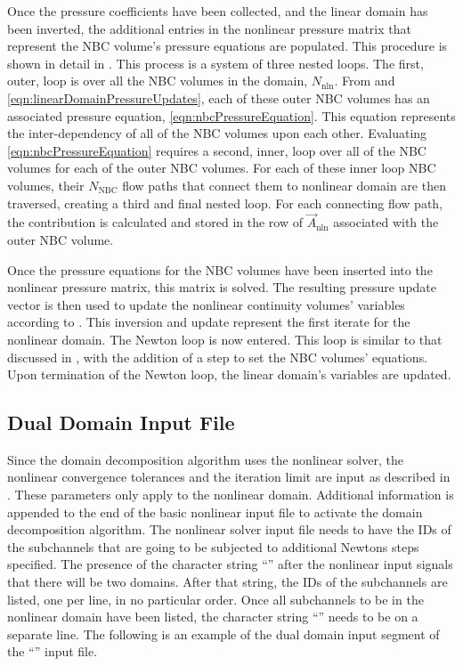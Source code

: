 Once the pressure coefficients have been collected, and the linear domain has been inverted, the additional entries in the nonlinear pressure matrix that represent the NBC volume's pressure equations are populated.
This procedure is shown in detail in .
This process is a system of three nested loops.
The first, outer, loop is over all the NBC volumes in the domain, $N_{\text{nln}}$.
From  and \eqref{eqn:linearDomainPressureUpdates}, each of these outer NBC volumes has an associated pressure equation, \eqref{eqn:nbcPressureEquation}.
This equation represents the inter-dependency of all of the NBC volumes upon each other.
Evaluating \eqref{eqn:nbcPressureEquation} requires a second, inner, loop over all of the NBC volumes for each of the outer NBC volumes.
For each of these inner loop NBC volumes, their $N_{\text{NBC}}$ flow paths that connect them to nonlinear domain are then traversed, creating a third and final nested loop.
For each connecting flow path, the contribution is calculated and stored in the row of $\vec{A}_{\text{nln}}$ associated with the outer NBC volume.

Once the pressure equations for the NBC volumes have been inserted into the nonlinear pressure matrix, this matrix is solved.
The resulting pressure update vector is then used to update the nonlinear continuity volumes' variables according to .
This inversion and update represent the first iterate for the nonlinear domain.
The Newton loop is now entered.
This loop is similar to that discussed in , with the addition of a step to set the NBC volumes' equations.
Upon termination of the Newton loop, the linear domain's variables are updated.

\subsection{Dual Domain Input File}
\label{subsect:domDecompInputFile}

Since the domain decomposition algorithm uses the nonlinear solver, the nonlinear convergence tolerances and the iteration limit are input as described in .
These parameters only apply to the nonlinear domain.
Additional information is appended to the end of the basic nonlinear input file to activate the domain decomposition algorithm.
The nonlinear solver input file needs to have the IDs of the subchannels that are going to be subjected to additional Newtons steps specified.
The presence of the character string ``'' after the nonlinear input signals that there will be two domains.
After that string, the IDs of the subchannels are listed, one per line, in no particular order.
Once all subchannels to be in the nonlinear domain have been listed, the character string ``'' needs to be on a separate line.
The following is an example of the dual domain input segment of the ``'' input file.

